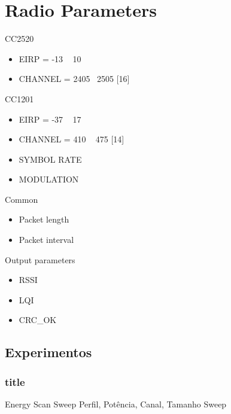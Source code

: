 \documentclass{article}
\begin{document}
\section{Radio Parameters}
CC2520
\begin{itemize}
	\item EIRP = -13 ~ 10
	\item CHANNEL = 2405 ~2505 [16]
\end{itemize}
CC1201
\begin{itemize}
	\item EIRP = -37 ~ 17
	\item CHANNEL = 410 ~ 475 [14]
	\item SYMBOL RATE
	\item MODULATION
\end{itemize}
Common
\begin{itemize}
	\item Packet length
	\item Packet interval
\end{itemize}
Output parameters
\begin{itemize}
	\item RSSI
	\item LQI
	\item CRC\_OK
\end{itemize}

\subsection{Experimentos}
\subsubsection{title}
Energy Scan
Sweep {Perfil, Potência, Canal, Tamanho}
Sweep {}
\clearpage



\end{document}
